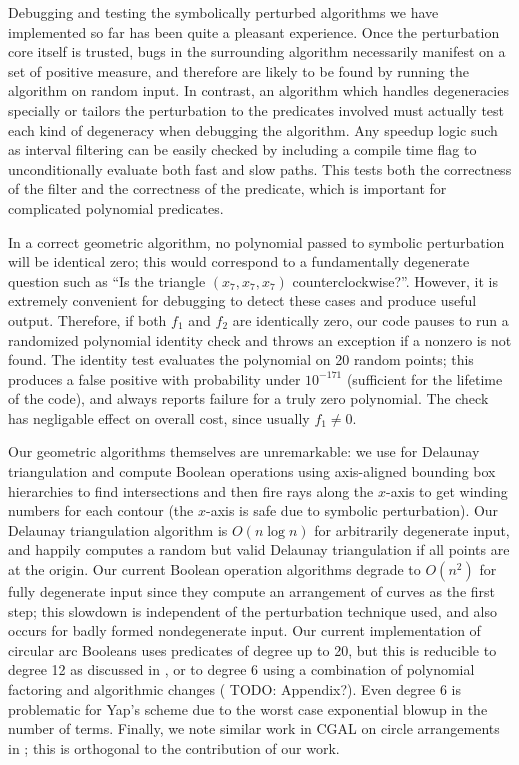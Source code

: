 \documentclass[11pt]{article}
\newcommand{\TODO}{{\color{red} TODO}}
\begin{document}
Debugging and testing the symbolically perturbed algorithms we have implemented so far has been quite a pleasant experience.  Once the perturbation core itself is trusted,
bugs in the surrounding algorithm necessarily manifest on a set of positive measure, and therefore are likely to be found by running the algorithm on random input.  In contrast, an
algorithm which handles degeneracies specially or tailors the perturbation to the predicates involved must actually test each kind of degeneracy when debugging the algorithm.
Any speedup logic such as interval filtering can be easily checked by including a compile time flag to unconditionally evaluate both fast and slow paths.  This tests both the
correctness of the filter and the correctness of the predicate, which is important for complicated polynomial predicates.

In a correct geometric algorithm, no polynomial passed to symbolic perturbation will be identical zero; this would correspond to a fundamentally degenerate question such as
``Is the triangle $(x_7,x_7,x_7)$ counterclockwise?''.  However, it is extremely convenient for debugging to detect these cases and produce useful output.  Therefore,
if both $f_1$ and $f_2$ are identically zero, our code pauses to run a randomized polynomial identity check \cite{schwartz1980fast} and throws an exception if a nonzero is not found.
The identity test evaluates the polynomial on 20 random points; this produces a false positive with probability under $10^{-171}$ (sufficient for the
lifetime of the code), and always reports failure for a truly zero polynomial.  The check has negligable effect on overall cost, since usually $f_1 \ne 0$.

Our geometric algorithms themselves are unremarkable: we use \cite{amenta2003incremental} for Delaunay triangulation and compute Boolean operations using axis-aligned bounding
box hierarchies to find intersections and then fire rays along the $x$-axis to get winding numbers for each contour (the $x$-axis is safe due to symbolic perturbation).  Our Delaunay
triangulation algorithm is $O(n \log n)$ for arbitrarily degenerate input, and happily computes a random but valid Delaunay triangulation if all points are at the origin.  Our current Boolean
operation algorithms degrade to $O(n^2)$ for fully degenerate input since they compute an arrangement of curves as the first step; this slowdown is independent of the perturbation
technique used, and also occurs for badly formed nondegenerate input.  Our current implementation of circular arc Booleans uses predicates of degree up to 20, but this is reducible 
to degree 12 as discussed in \cite{devillers2000algebraic}, or to degree 6 using a combination of polynomial factoring and algorithmic changes (\TODO: Appendix?).  Even
degree 6 is problematic for Yap's scheme due to the worst case exponential blowup in the number of terms.  Finally, we note similar work in CGAL on circle arrangements in
\cite{wein2006circles}; this is orthogonal to the contribution of our work.
\end{document}
